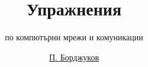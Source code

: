 \documentclass{scrartcl}
\begin{document}
\title{Упражнения}
\subtitle{по компютърни мрежи и комуникации}
\author{\href{mailto:bordjukov@gmail.com}{П. Борджуков}}
\date{}

\maketitle



\end{document}
